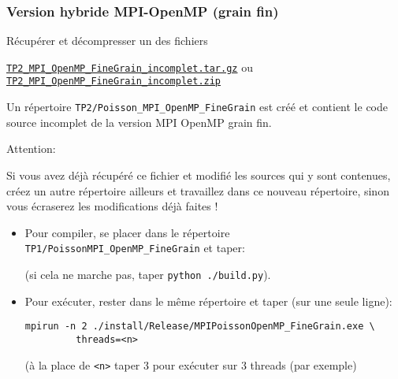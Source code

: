 \documentclass{beamer}
\begin{document}
\begin{frame}[fragile]
	\frametitle{Version hybride MPI-OpenMP (grain fin)}
	
Récupérer et décompresser un des fichiers \bigskip

\href{https://perso.ensta-paris.fr/~tajchman/Seance5/TP2_MPI_OpenMP_FineGrain_incomplet.tar.gz}{\tt TP2\_MPI\_OpenMP\_FineGrain\_incomplet.tar.gz} ou \href{https://perso.ensta-paris.fr/~tajchman/Seance5/TP2_MPI_OpenMP_FineGrain_incomplet.zip}{\tt TP2\_MPI\_OpenMP\_FineGrain\_incomplet.zip}
\bigskip

Un répertoire {\tt TP2/Poisson\_MPI\_OpenMP\_FineGrain} est créé et contient le code source incomplet de la version MPI OpenMP grain fin.
 
\vfill
{\color{red}
	Attention:
	\bigskip
	
	\begin{minipage}{\textwidth}\color{red}
Si vous avez déjà récupéré ce fichier et modifié les sources qui y sont contenues, créez un autre répertoire ailleurs et travaillez dans ce nouveau répertoire, sinon vous écraserez les modifications déjà faites !
	\end{minipage}
}
\vfill
\end{frame}

\begin{frame}[fragile]

\begin{itemize}
	\item 	Pour compiler, se placer dans le répertoire {\tt TP1/PoissonMPI\_OpenMP\_FineGrain} et taper:
	
	
	\vfill
	(si cela ne marche pas, taper \verb|python ./build.py|).
	
	\vfill
	\item Pour exécuter, rester dans le même répertoire et taper (sur une seule ligne):
	
	\hspace{2cm}
	{\color{blue}\begin{verbatim}
mpirun -n 2 ./install/Release/MPIPoissonOpenMP_FineGrain.exe \
		 threads=<n>
\end{verbatim}
	}
	
	\vfill
	(à la place de {\tt <n>} taper 3 pour exécuter sur 3 threads (par exemple)
	\vfill
	
\end{itemize}
\end{frame}
\end{document}
